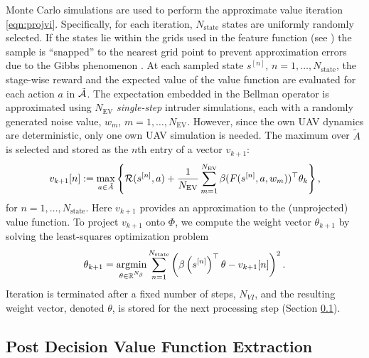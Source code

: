 Monte Carlo simulations are used to perform the approximate value iteration \eqref{eqn:projvi}. Specifically, for each iteration, $N_\text{state}$ states are uniformly randomly selected. If the states lie within the grids used in the feature function (see ) the sample is ``snapped'' to the nearest grid point to prevent approximation errors due to the Gibbs phenomenon \cite{JF-FBR:91}. At each sampled state $s^{[n]}$, $n=1,\ldots, N_\text{state}$, the stage-wise reward and the expected value of the value function are evaluated for each action $a$ in $\tilde{\mathcal{A}}$. The expectation embedded in the Bellman operator is approximated using $N_{\text{EV}}$ \emph{single-step} intruder simulations, each with a randomly generated noise value, $w_m$, $m=1,\ldots, N_{\text{EV}}$. However, since the own UAV dynamics are deterministic, only one own UAV simulation is needed. The maximum over $\tilde{A}$ is selected and stored as the $n$th entry of a vector $v_{k+1}$:
\begin{equation}
    v_{k+1}[n] := \max_{a \in \tilde{A}} \left\{\mathcal{R}(s^{[n]},a) + \frac{1}{N_{\text{EV}}}\sum_{m=1}^{N_{\text{EV}}} \beta(F(s^{[n]}, a, w_m))^\top \theta_k \right\} \text{,}
\end{equation}
for $n=1,\ldots, N_\text{state}$. Here $v_{k+1}$ provides an approximation to the (unprojected) value function. To project $v_{k+1}$ onto $\Phi$, we compute the weight vector $\theta_{k+1}$ by solving the least-squares optimization problem
\begin{equation} \label{eq:leastsq}
    \theta_{k+1} = \underset{\theta\in \reals^{N_\beta}}{\argmin} \sum_{n=1}^{N_\text{state}} \left( \beta\left(s^{[n]}\right)^\top \theta - v_{k+1}[n] \right) ^2 \text{.}
\end{equation}
Iteration is terminated after a fixed number of steps, $N_{VI}$, and the resulting weight vector, denoted $\theta$, is stored for the next processing step (Section \ref{sec:extract}).

\subsection{Post Decision Value Function Extraction} \label{sec:extract}


